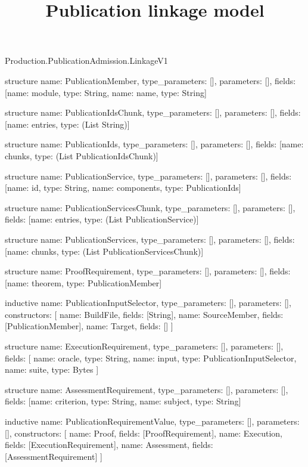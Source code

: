 \begin{lexlean}{Production.PublicationAdmission.LinkageV1}
\title{Publication linkage model}
\begin{semanticmodule}
structure{
  name: PublicationMember,
  type_parameters: [],
  parameters: [],
  fields: [{name: module, type: String}, {name: name, type: String}]
}

structure{
  name: PublicationIdsChunk,
  type_parameters: [],
  parameters: [],
  fields: [{name: entries, type: (List String)}]
}

structure{
  name: PublicationIds,
  type_parameters: [],
  parameters: [],
  fields: [{name: chunks, type: (List PublicationIdsChunk)}]
}

structure{
  name: PublicationService,
  type_parameters: [],
  parameters: [],
  fields: [{name: id, type: String}, {name: components, type: PublicationIds}]
}

structure{
  name: PublicationServicesChunk,
  type_parameters: [],
  parameters: [],
  fields: [{name: entries, type: (List PublicationService)}]
}

structure{
  name: PublicationServices,
  type_parameters: [],
  parameters: [],
  fields: [{name: chunks, type: (List PublicationServicesChunk)}]
}

structure{
  name: ProofRequirement,
  type_parameters: [],
  parameters: [],
  fields: [{name: theorem, type: PublicationMember}]
}

inductive{
  name: PublicationInputSelector,
  type_parameters: [],
  parameters: [],
  constructors: [
    {name: BuildFile, fields: [String]},
    {name: SourceMember, fields: [PublicationMember]},
    {name: Target, fields: []}
  ]
}

structure{
  name: ExecutionRequirement,
  type_parameters: [],
  parameters: [],
  fields: [
    {name: oracle, type: String},
    {name: input, type: PublicationInputSelector},
    {name: suite, type: Bytes}
  ]
}

structure{
  name: AssessmentRequirement,
  type_parameters: [],
  parameters: [],
  fields: [{name: criterion, type: String}, {name: subject, type: String}]
}

inductive{
  name: PublicationRequirementValue,
  type_parameters: [],
  parameters: [],
  constructors: [
    {name: Proof, fields: [ProofRequirement]},
    {name: Execution, fields: [ExecutionRequirement]},
    {name: Assessment, fields: [AssessmentRequirement]}
  ]
}


\end{semanticmodule}
\end{lexlean}
